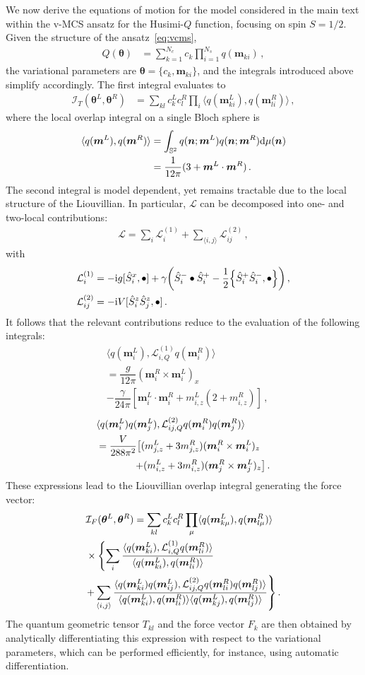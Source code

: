 \documentclass[aps,prl,twocolumn,superscriptaddress,english,floatfix]{revtex4-2}
\let\originalleft\left
\let\originalright\right
\renewcommand{\left}{\mathopen{}\mathclose\bgroup\originalleft}
\renewcommand{\right}{\aftergroup\egroup\originalright}
\newcommand{\vect}[1]{\boldsymbol{#1}}
\renewcommand{\vec}[1]{\vect{#1}}
\def\rmi{{\rm {i}}}
\renewcommand{\d}{{\rm {d}}}
\newcommand{\thetavec}{{\vec{\theta}}}
\newcommand{\Ical}{\mathcal{I}}
\newcommand{\lcal}{\mathcal{L}}
\newcommand{\mvec}{\vec{m}}
\newcommand{\nvec}{{\vec{n}}}
\newcommand{\Shat}{\hat{S}}
\newcommand{\bea}{\begin{equation}\begin{aligned}}
\newcommand{\eea}{\end{aligned}\end{equation}}
\begin{document}
We now derive the equations of motion for the model considered in the main text within the v-MCS ansatz for the Husimi-$Q$ function, focusing on spin $S=1/2$. 
Given the structure of the ansatz~\eqref{eq:vcms}, 
\bea
    Q(\thetavec) &= \sum_{k=1}^{N_c} c_k\prod_{i=1}^{N_s} q(\mvec_{ki})\,,
    \eea
the variational parameters are $\thetavec=\{c_k,\mvec_{ki}\}$, and the integrals introduced above simplify accordingly. The first integral evaluates to
\bea
    \Ical_T(\thetavec^L,\thetavec^R) &= \sum_{kl}c^L_k c^R_l \prod_i\langle q(\mvec^L_{ki}),q(\mvec^R_{li})\rangle\,,
\eea
where the local overlap integral on a single Bloch sphere is
\bea
    \langle q(\mvec^L),q(\mvec^R)\rangle &= \int_{\mathbb{S}^2}q(\nvec;\mvec^L)q(\nvec;
    \mvec^R)\d\mu(\nvec)\\&= \dfrac{1}{12\pi}(3+\mvec^L\cdot\mvec^R)\,.
\eea
The second integral is model dependent, yet remains tractable due to the local structure of the Liouvillian. In particular, $\lcal$ can be decomposed into one- and two-local contributions:
\bea
    \lcal = \sum_{i}\lcal_i^{(1)} + \sum_{\langle i,j\rangle}\lcal_{ij}^{(2)}\,,
\eea
with
\bea
    \lcal_i^{(1)} &= -\rmi g[\Shat_i^x,\bullet] + \gamma \left(\Shat_i^-\bullet\Shat_i^+ - \dfrac{1}{2}\left\{ \Shat_i^+\Shat_i^-,\bullet \right\}\right)\,,\\
    \lcal_{ij}^{(2)} &= -\rmi V[\Shat_i^z\Shat_j^z,\bullet]\,.
\eea
It follows that the relevant contributions reduce to the evaluation of the following integrals:
\bea
    &\langle q(\mvec_i^L), \lcal^{(1)}_{i,Q} q(\mvec_i^R)\rangle \\&= \dfrac{g}{12\pi}(\mvec_i^R\times\mvec_i^L)_x\\
    &-\dfrac{\gamma}{24\pi}[\mvec_i^L\cdot\mvec_i^R + m^L_{i,z}(2+m^R_{i,z})]\,,
\eea
\bea
     &\langle q(\mvec_i^L)q(\mvec_j^L), \lcal^{(2)}_{ij,Q} q(\mvec_i^R)q(\mvec_j^R)\rangle \\&= \dfrac{V}{288 \pi ^2} \left[(m^L_{j,z}+3 m^R_{j,z}) (\mvec^R_i\times\mvec^L_i)_z\right.\\
     &\phantom{=====}\left.+(m^L_{i,z}+3 m^R_{i,z}) (\mvec^R_j\times\mvec^L_j)_z\right]\,.
\eea
These expressions lead to the Liouvillian overlap integral generating the force vector:
\bea
    &\Ical_F(\thetavec^L,\thetavec^R) = \sum_{kl}c_k^L c_l^R \prod_\mu\langle q(\mvec^L_{k\mu}),q(\mvec^R_{l\mu})\rangle\\
    &\times\left\{\sum_i\dfrac{\langle q(\mvec^L_{ki}),\lcal^{(1)}_{i,Q}q(\mvec^R_{li}) \rangle}{\langle q(\mvec^L_{ki}),q(\mvec^R_{li}) \rangle}\right.\\
    &\left.+\sum_{\langle i,j\rangle} \dfrac{\langle q(\mvec^L_{ki})q(\mvec^L_{ij}),\lcal^{(2)}_{ij,Q}q(\mvec^R_{li})q(\mvec^R_{lj}) \rangle}{\langle q(\mvec^L_{ki}),q(\mvec^R_{li}) \rangle \langle q(\mvec^L_{kj}),q(\mvec^R_{lj}) \rangle}\right\}\,.
\eea
The quantum geometric tensor $T_{kl}$ and the force vector $F_k$ are then obtained by analytically differentiating this expression with respect to the variational parameters, which can be performed efficiently, for instance, using automatic differentiation.
\end{document}
